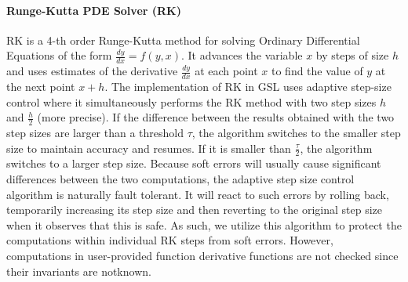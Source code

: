 \documentclass{sig-alternate}
\begin{document}
{\vspace{-5pt}
\paragraph{Runge-Kutta PDE Solver (RK)}
RK is a 4-th order Runge-Kutta method for solving Ordinary Differential Equations of the form $\frac{dy}{dx} = f(y, x)$.
It advances the variable $x$ by steps of size $h$ and uses estimates of the derivative $\frac{dy}{dx}$ at each point $x$ to find the value of $y$ at the next point $x+h$.
The implementation of RK in GSL uses adaptive step-size control where it simultaneously performs the RK method with two step sizes $h$ and $\frac{h}{2}$ (more precise).
If the difference between the results obtained with the two step sizes are larger than a threshold $\tau$, the algorithm switches to the smaller step size to maintain accuracy and resumes.
If it is smaller than $\frac{\tau}{2}$, the algorithm switches to a larger step size.
Because soft errors will usually cause significant differences between the two computations, the adaptive step size control algorithm is naturally fault tolerant.
It will react to such errors by rolling back, temporarily increasing its step size and then reverting to the original step size when it observes that this is safe.
As such, we utilize this algorithm to protect the computations within individual RK steps from soft errors.
However, computations in user-provided function derivative functions are not checked since their invariants are notknown.


}
\end{document}
